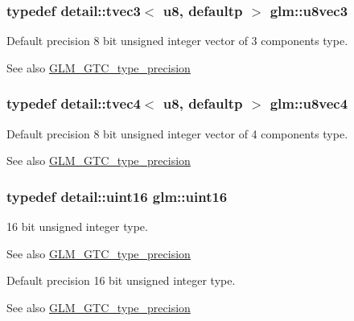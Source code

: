 \subsubsection[{\texorpdfstring{u8vec3}{u8vec3}}]{\setlength{\rightskip}{0pt plus 5cm}typedef detail\+::tvec3$<$ u8, defaultp $>$ {\bf glm\+::u8vec3}}\hypertarget{group__gtc__type__precision_ga3b4624ecd0485fe5143f956864e7934e}{}\label{group__gtc__type__precision_ga3b4624ecd0485fe5143f956864e7934e}
Default precision 8 bit unsigned integer vector of 3 components type. \begin{DoxySeeAlso}{See also}
\hyperlink{group__gtc__type__precision}{G\+L\+M\+\_\+\+G\+T\+C\+\_\+type\+\_\+precision} 
\end{DoxySeeAlso}
\subsubsection[{\texorpdfstring{u8vec4}{u8vec4}}]{\setlength{\rightskip}{0pt plus 5cm}typedef detail\+::tvec4$<$ u8, defaultp $>$ {\bf glm\+::u8vec4}}\hypertarget{group__gtc__type__precision_gaaf6b3d127698d893de8652deedfd3d9b}{}\label{group__gtc__type__precision_gaaf6b3d127698d893de8652deedfd3d9b}
Default precision 8 bit unsigned integer vector of 4 components type. \begin{DoxySeeAlso}{See also}
\hyperlink{group__gtc__type__precision}{G\+L\+M\+\_\+\+G\+T\+C\+\_\+type\+\_\+precision} 
\end{DoxySeeAlso}
\subsubsection[{\texorpdfstring{uint16}{uint16}}]{\setlength{\rightskip}{0pt plus 5cm}typedef detail\+::uint16 {\bf glm\+::uint16}}\hypertarget{group__gtc__type__precision_gad8c2939e1fdd8e5828b31d95c52255d5}{}\label{group__gtc__type__precision_gad8c2939e1fdd8e5828b31d95c52255d5}
16 bit unsigned integer type. \begin{DoxySeeAlso}{See also}
\hyperlink{group__gtc__type__precision}{G\+L\+M\+\_\+\+G\+T\+C\+\_\+type\+\_\+precision}
\end{DoxySeeAlso}
Default precision 16 bit unsigned integer type. \begin{DoxySeeAlso}{See also}
\hyperlink{group__gtc__type__precision}{G\+L\+M\+\_\+\+G\+T\+C\+\_\+type\+\_\+precision} 
\end{DoxySeeAlso}
